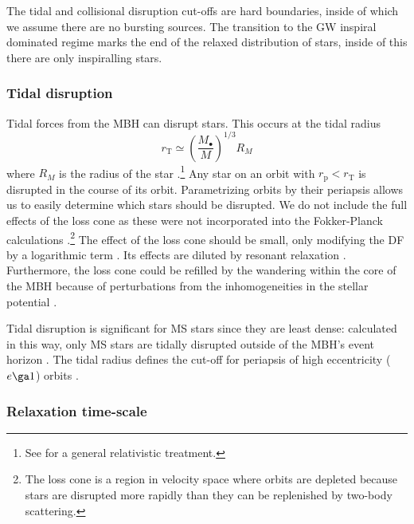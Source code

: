 \documentclass[useAMS,usedcolumn,usegraphicx,usenatbib]{mn2e}
\newcommand{\sub}[1]{\ensuremath{_\mathrm{#1}}}
\begin{document}
The tidal and collisional disruption cut-offs are hard boundaries, inside of which we assume there are no bursting sources. The transition to the GW inspiral dominated regime marks the end of the relaxed distribution of stars, inside of this there are only inspiralling stars.

\subsubsection{Tidal disruption}\label{sec:Tidal}

Tidal forces from the MBH can disrupt stars. This occurs at the tidal radius
\begin{equation}
r\sub{T} \simeq \left(\frac{M_\bullet}{M}\right)^{1/3}R_M
\label{eq:Tidal}
\end{equation}
where $R_M$ is the radius of the star \citep{Hills1975, Rees1988, Kobayashi2004}.\footnote{See \citet{Kesden2012} for a general relativistic treatment.} Any star on an orbit with $r\sub{p} < r\sub{T}$ is disrupted in the course of its orbit. Parametrizing orbits by their periapsis allows us to easily determine which stars should be disrupted. We do not include the full effects of the loss cone \citep{Frank1976, Lightman1977, Cohn1978} as these were not incorporated into the Fokker-Planck calculations \citep{Hopman2009}.\footnote{The loss cone is a region in velocity space where orbits are depleted because stars are disrupted more rapidly than they can be replenished by two-body scattering.} The effect of the loss cone should be small, only modifying the DF by a logarithmic term \citep{Lightman1977, Bahcall1977, Cohn1978}. Its effects are diluted by resonant relaxation \citep{Hopman2007,Toonen2009,Merritt2011}. Furthermore, the loss cone could be refilled by the wandering within the core of the MBH because of perturbations from the inhomogeneities in the stellar potential \citep{Sigurdsson1997,Chatterjee2002,Merritt2007}.

Tidal disruption is significant for MS stars since they are least dense: calculated in this way, only MS stars are tidally disrupted outside of the MBH's event horizon \citep{Sigurdsson1997}. The tidal radius defines the cut-off for periapsis of high eccentricity ($e \ga 1$) orbits \citep{Lightman1977}.

\subsubsection{Relaxation time-scale}\label{sec:Relax}
\end{document}
